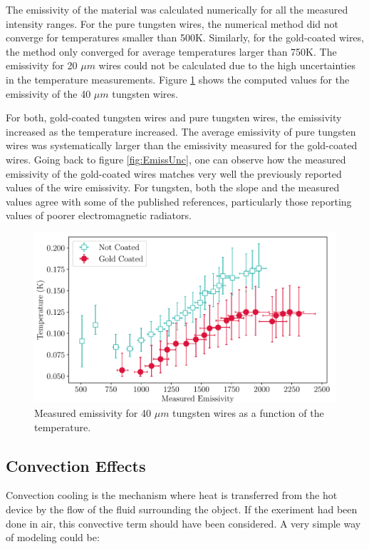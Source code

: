 The emissivity of the material was calculated numerically for all the measured intensity ranges. For the pure tungsten wires, the numerical method did not converge for temperatures smaller than 500K. Similarly, for the gold-coated wires, the method only converged for average temperatures larger than 750K. The emissivity for 20 $\mu m$ wires could not be calculated due to the high uncertainties in the temperature measurements. Figure \ref{fig:EmissivityCalculations} shows the computed values for the emissivity of the 40 $\mu m$ tungsten wires. 

For both, gold-coated tungsten wires and pure tungsten wires, the emissivity increased as the temperature increased. The average emissivity of pure tungsten wires was systematically larger than the emissivity measured for the gold-coated wires. Going back to figure \ref{fig:EmissUnc}, one can observe how the measured emissivity of the gold-coated wires matches very well the previously reported values of the wire emissivity. For tungsten, both the slope and the measured values agree with some of the published references, particularly those reporting values of poorer electromagnetic radiators. 

\begin{figure}[h]
    \centering
    \includegraphics[width=0.8\columnwidth]{EmissivitySummary/EmissivitySummaryPlot.pdf}
    \caption{Measured emissivity for 40 $\mu m$ tungsten wires as a function of the temperature.}
    \label{fig:EmissivityCalculations}
\end{figure}

\subsection{Convection Effects}

Convection cooling is the mechanism where heat is transferred from the hot device by the flow of the fluid surrounding the object. If the exeriment had been done in air, this convective term should have been considered. A very simple way of modeling could be: 

